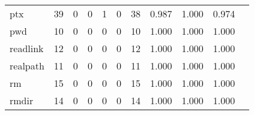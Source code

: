 \begin{longtable}{lp{1.2cm}p{1.2cm}p{1.2cm}p{1.2cm}p{1.2cm}p{1.2cm}p{1.2cm}p{1.2cm}p{1.2cm}p{1.2cm}}
ptx       &                                    39 &                                                  0 &                                                  0 &                                                  1 &                                                  0 &                                                 38 &                                         0.987 &                                              1.000 &                                              0.974 \\
pwd       &                                    10 &                                                  0 &                                                  0 &                                                  0 &                                                  0 &                                                 10 &                                         1.000 &                                              1.000 &                                              1.000 \\
readlink  &                                    12 &                                                  0 &                                                  0 &                                                  0 &                                                  0 &                                                 12 &                                         1.000 &                                              1.000 &                                              1.000 \\
realpath  &                                    11 &                                                  0 &                                                  0 &                                                  0 &                                                  0 &                                                 11 &                                         1.000 &                                              1.000 &                                              1.000 \\
rm        &                                    15 &                                                  0 &                                                  0 &                                                  0 &                                                  0 &                                                 15 &                                         1.000 &                                              1.000 &                                              1.000 \\
rmdir     &                                    14 &                                                  0 &                                                  0 &                                                  0 &                                                  0 &                                                 14 &                                         1.000 &                                              1.000 &                                              1.000 \\

\end{longtable}
